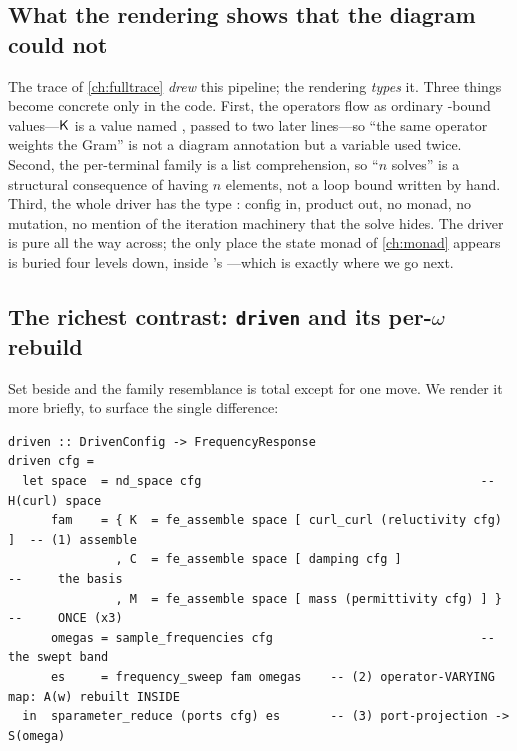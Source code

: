 \subsection{What the rendering shows that the diagram could not}

The trace of \cref{ch:fulltrace} \emph{drew} this pipeline; the rendering
\emph{types} it. Three things become concrete only in the code. First, the operators
flow as ordinary -bound values---$\mathsf{K}$ is a value named , passed
to two later lines---so ``the same operator weights the Gram'' is not a diagram
annotation but a variable used twice. Second, the per-terminal family is a list
comprehension, so ``$n$ solves'' is a structural consequence of
 having $n$ elements, not a loop bound written by hand.
Third, the whole driver has the type :
config in, product out, no monad, no mutation, no mention of the iteration machinery
that the solve hides. The driver is pure all the way across; the only place the
state monad of \cref{ch:monad} appears is buried four levels down, inside
's ---which is exactly where we go next.

\subsection{The richest contrast: \texttt{driven} and its per-\texorpdfstring{$\omega$}{omega} rebuild}
\label{sec:driven-contrast}

Set  beside  and the family resemblance is total
except for one move. We render it more briefly, to surface the single difference:

\begin{lstlisting}[style=l4style]
driven :: DrivenConfig -> FrequencyResponse
driven cfg =
  let space  = nd_space cfg                                       -- H(curl) space
      fam    = { K  = fe_assemble space [ curl_curl (reluctivity cfg) ]  -- (1) assemble
               , C  = fe_assemble space [ damping cfg ]                  --     the basis
               , M  = fe_assemble space [ mass (permittivity cfg) ] }    --     ONCE (x3)
      omegas = sample_frequencies cfg                             -- the swept band
      es     = frequency_sweep fam omegas    -- (2) operator-VARYING map: A(w) rebuilt INSIDE
  in  sparameter_reduce (ports cfg) es       -- (3) port-projection -> S(omega)
\end{lstlisting}

